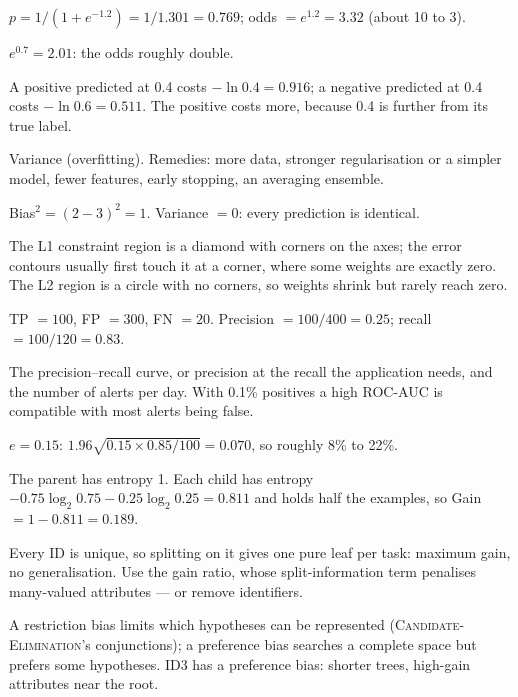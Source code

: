 \begin{ans}
  \item $p = 1/(1 + e^{-1.2}) = 1/1.301 = 0.769$; odds $= e^{1.2} = 3.32$ (about 10 to 3).
  \item $e^{0.7} = 2.01$: the odds roughly double.
  \item A positive predicted at 0.4 costs $-\ln 0.4 = 0.916$; a negative predicted at
        0.4 costs $-\ln 0.6 = 0.511$. The positive costs more, because 0.4 is further
        from its true label.
\end{ans}

\begin{ans}
  \item Variance (overfitting). Remedies: more data, stronger regularisation or a
        simpler model, fewer features, early stopping, an averaging ensemble.
  \item Bias$^2 = (2 - 3)^2 = 1$. Variance $= 0$: every prediction is identical.
  \item The L1 constraint region is a diamond with corners on the axes; the error
        contours usually first touch it at a corner, where some weights are exactly
        zero. The L2 region is a circle with no corners, so weights shrink but rarely
        reach zero.
\end{ans}

\begin{ans}
  \item TP $= 100$, FP $= 300$, FN $= 20$. Precision $= 100/400 = 0.25$; recall
        $= 100/120 = 0.83$.
  \item The precision--recall curve, or precision at the recall the application needs,
        and the number of alerts per day. With 0.1\% positives a high ROC-AUC is
        compatible with most alerts being false.
  \item $e = 0.15$: $1.96\sqrt{0.15 \times 0.85/100} = 0.070$, so roughly 8\% to 22\%.
\end{ans}

\begin{ans}
  \item The parent has entropy 1. Each child has entropy
        $-0.75\log_2 0.75 - 0.25\log_2 0.25 = 0.811$ and holds half the examples, so
        Gain $= 1 - 0.811 = 0.189$.
  \item Every ID is unique, so splitting on it gives one pure leaf per task: maximum
        gain, no generalisation. Use the gain ratio, whose split-information term
        penalises many-valued attributes --- or remove identifiers.
  \item A restriction bias limits which hypotheses can be represented
        (\textsc{Candidate-Elimination}'s conjunctions); a preference bias searches a
        complete space but prefers some hypotheses. ID3 has a preference bias: shorter
        trees, high-gain attributes near the root.
\end{ans}


